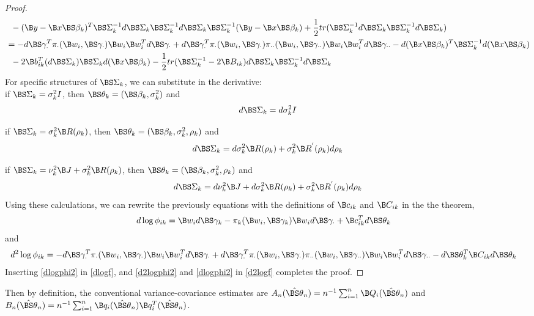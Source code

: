 \begin{proof}
\begin{align}
&\;\;-(\B y-\B x\BS \beta_{k})^{T}\BS\Sigma_{k}^{-1}d\BS\Sigma_{k}\BS\Sigma_{k}^{-1}d\BS\Sigma_{k}\BS\Sigma_{k}^{-1}(\B y-\B x\BS\beta_{k})+\frac{1}{2}tr(\BS\Sigma_{k}^{-1}d\BS\Sigma_{k}\BS\Sigma_{k}^{-1}d\BS\Sigma_{k})\nonumber\\
&=-d\BS\gamma_{\cdot}^{T}\pi_{\cdot}(\B w_{i},\BS\gamma_{\cdot})\B w_{i}\B w_{i}^{T}d\BS\gamma_{\cdot}+d\BS\gamma_{\cdot}^{T}\pi_{\cdot}(\B w_{i},\BS\gamma_{\cdot})\pi_{\cdot\cdot}(\B w_{i},\BS\gamma_{\cdot\cdot})\B w_{i}\B w_{i}^{T}d\BS\gamma_{\cdot\cdot}-d(\B x\BS \beta_{k})^{T}\BS\Sigma_{k}^{-1}d(\B x\BS \beta_{k})\nonumber\\
&\;\;-2\B b_{ik}^{T}(d\BS\Sigma_{k})\BS\Sigma_{k}d(\B x\BS\beta_{k})-\frac{1}{2}tr(\BS\Sigma_{k}^{-1}-2\B B_{ik})d\BS\Sigma_{k}\BS\Sigma_{k}^{-1}d\BS\Sigma_{k}\nonumber
\end{align}
For specific structures of $\BS\Sigma_{k}$, we can substitute in the derivative:\\

if $\BS\Sigma_{k}=\sigma_{k}^{2}I$, then $\BS\theta_{k}=(\BS\beta_{k},\sigma^{2}_{k})$ and
$$d\BS\Sigma_{k}=d\sigma_{k}^{2}I$$

if $\BS\Sigma_{k}=\sigma_{k}^{2}\B R(\rho_{k})$, then $\BS\theta_{k}=(\BS\beta_{k},\sigma^{2}_{k},\rho_{k})$ and
$$d\BS\Sigma_{k}=d\sigma_{k}^{2}\B R(\rho_{k}) +\sigma_{k}^{2}\B R^{'}(\rho_{k})d\rho_{k}$$

if $\BS\Sigma_{k}=\nu_{k}^{2}\B J+\sigma_{k}^{2}\B R(\rho_{k})$, then $\BS\theta_{k}=(\BS\beta_{k},\sigma^{2}_{k},\rho_{k})$ and
$$d\BS\Sigma_{k}=d\nu_{k}^{2}\B J + d\sigma_{k}^{2}\B R(\rho_{k}) +\sigma_{k}^{2}\B R^{'}(\rho_{k})d\rho_{k}$$
Using these calculations, we can rewrite the previously equations with the definitions of $\B c_{ik}$ and $\B C_{ik}$ in the the theorem,
\begin{align}\label{dlogphi2}
d\log \phi_{ik}&=\B w_{i} d\BS \gamma_{k} -\pi_{k}(\B w_{i},\BS\gamma_k)\B w_{i}d\BS\gamma_{\cdot}+\B c^{T}_{ik}d\BS\theta_{k} 
\end{align}
and
\begin{align}\label{d2logphi2}
d^{2}\log \phi_{ik}
&=-d\BS\gamma_{\cdot}^{T}\pi_{\cdot}(\B w_{i},\BS\gamma_{\cdot})\B w_{i}\B w_{i}^{T}d\BS\gamma_{\cdot}+d\BS\gamma_{\cdot}^{T}\pi_{\cdot}(\B w_{i},\BS\gamma_{\cdot})\pi_{\cdot\cdot}(\B w_{i},\BS\gamma_{\cdot\cdot})\B w_{i}\B w_{i}^{T}d\BS\gamma_{\cdot\cdot}-d\BS\theta_{k}^{T}\B C_{ik}d\BS\theta_{k}
\end{align}
Inserting \eqref{dlogphi2} in \eqref{dlogf}, and \eqref{d2logphi2} and \eqref{dlogphi2} in \eqref{d2logf} completes the proof.
\end{proof}
Then by definition, the conventional variance-covariance estimates are $A_{n}(\hat{\BS\theta}_{n})=n^{-1}\sum_{i=1}^{n}\B Q_{i}(\hat{\BS \theta}_{n})$ and $B_{n}(\hat{\BS\theta}_{n})=n^{-1}\sum_{i=1}^{n}\B q_{i}(\hat{\BS\theta}_{n})\B q_{i}^{T}(\hat{\BS\theta}_{n})$. 


